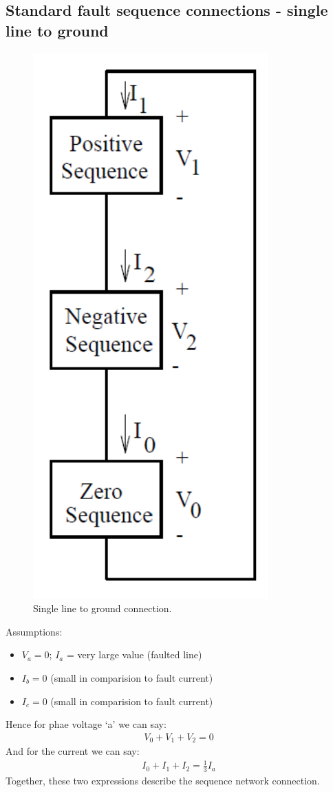 \documentclass[class=report, crop=false, 12pt,a4paper]{standalone}
\begin{document}
\subsection{Standard fault sequence connections - single line to ground}
\begin{figure}[H]
	\centering
	\includegraphics[width = 0.3 \textwidth]{../img/figure36.png}
	\caption{Single line to ground connection.}
\end{figure}
Assumptions:
\begin{itemize}
	\item $V_a = 0$; $I_a$ = very large value (faulted line)
	\item $I_b = 0$ (small in comparision to fault current)
	\item $I_c = 0$ (small in comparision to fault current)
\end{itemize}
Hence for phae voltage `a' we can say:
\begin{gather}
	V_0 + V_1 + V_2 = 0
\end{gather}
And for the current we can say:
\begin{gather}
	I_0 + I_1 + I_2 = \frac{1}{3}I_a
\end{gather}
Together, these two expressions describe the sequence network connection.
\end{document}
